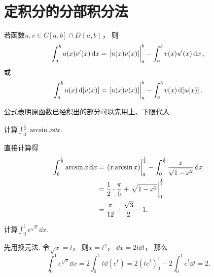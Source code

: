 \section{定积分的分部积分法}
\begin{theorem}\label{theorem:定积分.定积分的分部积分法}
若函数\(u,v \in C[a,b] \cap D(a,b)\)，
则\begin{equation}
	\int_a^b u(x) v'(x) \dd{x}
	= \eval{[u(x) v(x)]}_a^b
	- \int_a^b v(x) u'(x) \dd{x},
\end{equation}
或\begin{equation}
	\int_a^b u(x) \dd{[v(x)]}
	= \eval{[u(x) v(x)]}_a^b
	- \int_a^b v(x) \dd{[u(x)]}.
\end{equation}
\end{theorem}
公式表明原函数已经积出的部分可以先用上、下限代入.

\begin{example}
计算\(\int_0^{\frac12} \arcsin x \dd{x}\).
\begin{solution}
直接计算得\begin{align*}
	\int_0^{\frac12} \arcsin x \dd{x}
	&= \eval{(x \arcsin x)}_0^{\frac12}
		- \int_0^{\frac12} \frac{x}{\sqrt{1-x^2}} \dd{x} \\
	&= \frac12 \cdot \frac\pi6 + \eval{\sqrt{1-x^2}}_0^{\frac12} \\
	&= \frac\pi{12} + \frac{\sqrt3}2 - 1.
\end{align*}
\end{solution}
\end{example}

\begin{example}
计算\(\int_0^1 e^{\sqrt{x}} \dd{x}\).
\begin{solution}
先用换元法.
令\(\sqrt{x}=t\)，
则\(x=t^2\)，
\(\dd{x} = 2t\dd{t}\)，
那么\[
	\int_0^1 e^{\sqrt{x}} \dd{x}
	= 2 \int_0^1 t \dd(e^t)
	= 2 (t e^t)_0^1 - 2 \int_0^1 e^t \dd{t}
	= 2.
\]
\end{solution}
\end{example}

